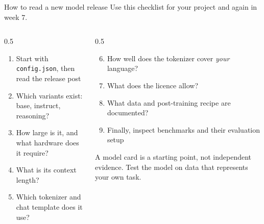 \documentclass[aspectratio=169,10pt]{beamer}
\begin{document}
\begin{frame}[shrink=3]{How to read a new model release}
  Use this checklist for your project and again in week 7.
  \vspace{0.5em}
  \begin{columns}[T]
    \begin{column}{0.5\textwidth}
      \begin{enumerate}
        \item Start with \texttt{config.json}, then read the release post
        \item Which variants exist: base, instruct, reasoning?
        \item How large is it, and what hardware does it require?
        \item What is its context length?
        \item Which tokenizer and chat template does it use?
      \end{enumerate}
    \end{column}
    \begin{column}{0.5\textwidth}
      \begin{enumerate}
        \setcounter{enumi}{5}
        \item How well does the tokenizer cover \emph{your} language?
        \item What does the licence allow?
        \item What data and post-training recipe are documented?
        \item Finally, inspect benchmarks and their evaluation setup
      \end{enumerate}
      \vspace{0.5em}
      \begin{gotcha}
        A model card is a starting point, not independent evidence. Test the
        model on data that represents your own task.
      \end{gotcha}
    \end{column}
  \end{columns}
\end{frame}

\end{document}
